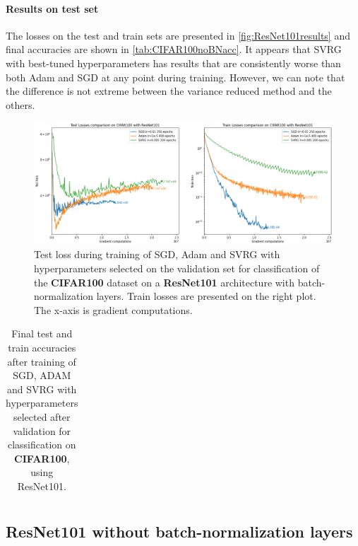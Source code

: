 \documentclass[a4paper,11pt,oneside]{report}
\begin{document}
\paragraph{Results on test set}
The losses on the test and train sets are presented in \autoref{fig:ResNet101results} and final accuracies are shown in \autoref{tab:CIFAR100noBNacc}. It appears that SVRG with best-tuned hyperparameters has results that are consistently worse than both Adam and SGD at any point during training. However, we can note that the difference is not extreme between the variance reduced method and the others.

\begin{figure}[h]
    \centering
    \includegraphics[width=\columnwidth]{report/figures/CIFAR100.png}
    \caption{Test loss during training of SGD, Adam and SVRG with hyperparameters selected on the validation set for classification of the \textbf{CIFAR100} dataset on a \textbf{ResNet101} architecture with batch-normalization layers. Train losses are presented on the right plot. The x-axis is gradient computations.}
    \label{fig:ResNet101results}
\end{figure}


\begin{table}[h]
    \begin{center}
        \begin{tabular}{||c | c | c||}
             \hline
             
        \end{tabular}
    \end{center}
    \caption{Final test and train accuracies after training of SGD, ADAM and SVRG with hyperparameters selected after validation for classification on \textbf{CIFAR100}, using ResNet101.}
    \label{tab:CIFAR100acc}
\end{table}

\subsection{ResNet101 without batch-normalization layers}\label{seq:ResNet101noBN}
\end{document}
